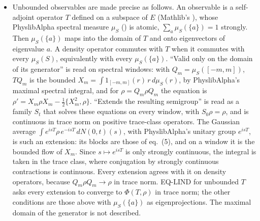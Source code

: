 \documentclass[11pt]{article}
\begin{document}
\begin{itemize}
  to $L$ of the limit and $\rho(t + 1) - \rho(t) \to 0$. ``All four conditions fail'' is read, for
  purely continuous spectrum ($\mu_S(\{a\}) = 0$ for every $a$), as follows. $X$ has no
  eigendecomposition, so the pinching is not defined (EQ-MEAS). No density operator commutes with
  $X$, so the minimizations of EQ-HS and EQ-KL have no solution. The Lindblad equation has no
  density-operator fixed point, and no solution converges in trace norm to a density operator
  (EQ-LIND). The conditions themselves quantify over eigendecompositions only, so they say
  nothing about such $X$; the statements above say that no extension to them can hold. In the
  mixed case, every commuting density operator, every density-operator fixed point and every
  density-operator limit of the flow lives on $H_{pp}$.
\item Unbounded observables are made precise as follows. An observable is a self-adjoint
  operator $T$ defined on a subspace of $E$ (Mathlib's ), whose PhyslibAlpha
  spectral measure $\mu_S$ () is atomic, $\sum_a \mu_S(\{a\}) = 1$ strongly. Then
  $\mu_S(\{a\})$ maps into the domain of $T$ and onto eigenvectors of eigenvalue $a$. A density
  operator commutes with $T$ when it commutes with every $\mu_S(S)$, equivalently with every
  $\mu_S(\{a\})$. ``Valid only on the domain of its generator'' is read on spectral windows: with
  $Q_m = \mu_S([-m, m])$, $TQ_m$ is the bounded $X_m = \int 1_{[-m,m]}(r)\,r\,d\mu_S(r)$, by
  PhyslibAlpha's maximal spectral integral, and for $\rho = Q_m\rho Q_m$ the equation is
  $\rho' = X_m\rho X_m - \frac12\{X_m^2, \rho\}$. ``Extends the resulting semigroup'' is read as a
  family $S_t$ that solves these equations on every window, with $S_0\rho = \rho$, and is
  continuous in trace norm on positive trace-class operators. The Gaussian average
  $\int e^{isT}\rho\,e^{-isT}\,dN(0,t)(s)$, with PhyslibAlpha's unitary group $e^{isT}$, is
  such an extension: its blocks are those of eq.~(5), and on a window it is the bounded flow of
  $X_m$. Since $s \mapsto e^{isT}$ is only strongly continuous, the integral is taken in the
  trace class, where conjugation by strongly continuous contractions is continuous. Every
  extension agrees with it on density operators, because $Q_m\rho Q_m \to \rho$ in trace norm.
  EQ-LIND for unbounded $T$ asks every extension to converge to $\Phi(T, \rho)$ in trace norm;
  the other conditions are those above with $\mu_S(\{a\})$ as eigenprojections. The maximal
  domain of the generator is not described.
\end{itemize}
\end{document}

